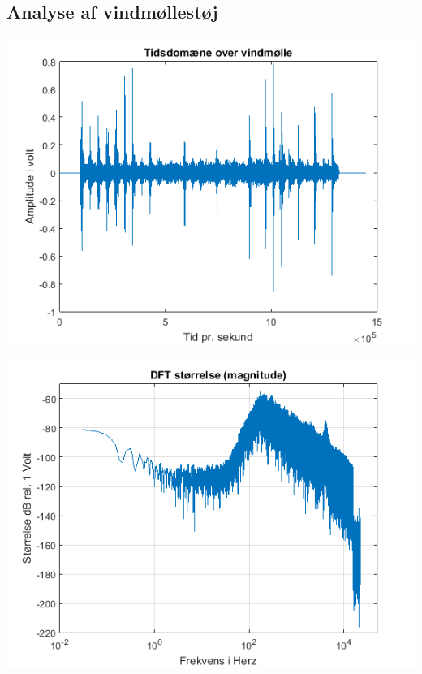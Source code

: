 \documentclass[12pt, letterpaper]{article}
\begin{document}
\subsection{Analyse af vindmøllestøj}

\begin{center}
\includegraphics[width=\textwidth]{billeder/vindtid}
\end{center}

\begin{center}
\includegraphics[width=\textwidth]{billeder/vindstorrelse}
\end{center}
\end{document}
